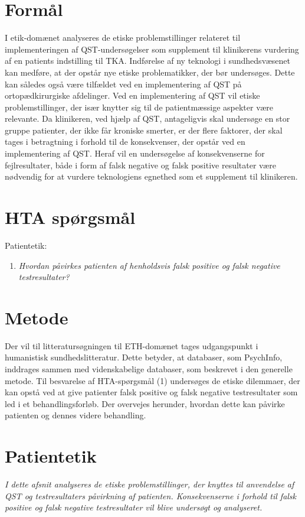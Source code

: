 \section{Formål}
I etik-domænet analyseres de etiske problemstillinger relateret til implementeringen af QST-undersøgelser som supplement til klinikerens vurdering af en patients indstilling til TKA. 
Indførelse af ny teknologi i sundhedsvæsenet kan medføre, at der opstår nye etiske problematikker, der bør undersøges. Dette kan således også være tilfældet ved en implementering af QST på ortopædkirurgiske afdelinger. 
Ved en implementering af QST vil etiske problemstillinger, der især knytter sig til de patientmæssige aspekter være relevante. Da klinikeren, ved hjælp af QST, antageligvis skal undersøge en stor gruppe patienter, der ikke får kroniske smerter, er der flere faktorer, der skal tages i betragtning i forhold til de konsekvenser, der opstår ved en implementering af QST. Heraf vil en undersøgelse af konsekvenserne for fejlresultater, både i form af falsk negative og falsk positive resultater være nødvendig for at vurdere teknologiens egnethed som et supplement til klinikeren. 


\section{HTA spørgsmål}
Patientetik:
\begin{enumerate}
\item \textit{Hvordan påvirkes patienten af henholdsvis falsk positive og falsk negative testresultater?} %
\end{enumerate}


\section{Metode}
Der vil til litteratursøgningen til ETH-domænet tages udgangspunkt i humanistisk sundhedslitteratur. Dette betyder, at databaser, som PsychInfo, inddrages sammen med videnskabelige databaser, som beskrevet i den generelle metode. 
Til besvarelse af HTA-spørgsmål (1) undersøges de etiske dilemmaer, der kan opstå ved at give patienter falsk positive og falsk negative testresultater som led i et behandlingsforløb. Der overvejes herunder, hvordan dette kan påvirke patienten og dennes videre behandling.


\section{Patientetik}
\textit{I dette afsnit analyseres de etiske problemstillinger, der knyttes til anvendelse af QST og testresultaters påvirkning af patienten. Konsekvenserne i forhold til falsk positive og falsk negative testresultater vil blive undersøgt og analyseret.}


